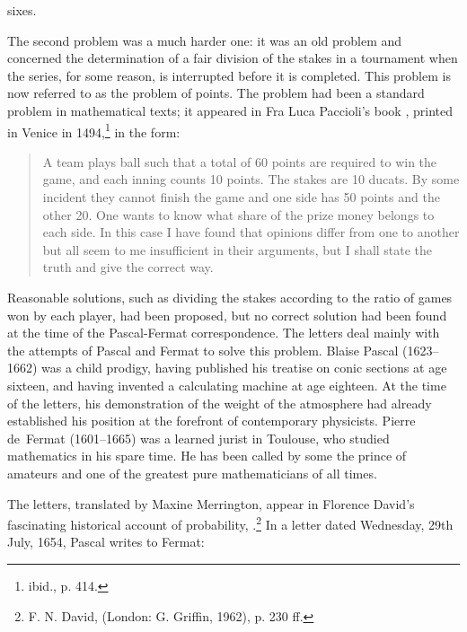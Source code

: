 sixes.
\par
The second problem was a much harder one: it was an old problem and concerned
the determination of a fair division of the stakes in a tournament when the
series, for some reason, is interrupted before it is completed.  This problem
is now referred to as the problem of points.  The problem
had been a standard problem in mathematical texts; it appeared in Fra Luca
Paccioli's book , printed in Venice in 1494,\footnote{ibid., p. 414.} in the
form:
\begin{quote}
A team plays ball such that a total of 60 points are required to win the
game, and each inning counts 10 points.  The stakes are 10 ducats.  By some
incident they cannot finish the game and one side has 50 points and the other
20.  One wants to know what share of the prize money belongs to each side.  In
this case I have found that opinions differ from one to another but all seem to
me insufficient in their arguments, but I shall state the truth and give the
correct way.
\end{quote}
\par
Reasonable solutions, such as dividing the stakes according to the ratio of
games won by each player, had been proposed, but no correct solution had been
found at the time of the Pascal-Fermat correspondence. 
The letters deal mainly with the attempts of Pascal and Fermat to solve this problem.  Blaise
Pascal (1623--1662) was a child prodigy, having published his
treatise on conic sections at age sixteen, and having invented a calculating
machine at age eighteen.  At the time of the letters, his demonstration of the weight of the
atmosphere had already established his position at the forefront of
contemporary physicists.  Pierre de~Fermat (1601--1665) was a learned jurist in
Toulouse, who studied mathematics in his spare time.  He has been called by some the prince of
amateurs and one of the greatest pure mathematicians of all times.
\par
The letters, translated by Maxine Merrington, appear in Florence David's
fascinating historical account of probability, .\footnote{F. N.
David,  (London: G. Griffin, 1962), p. 230
ff.}  In a letter dated Wednesday, 29th July, 1654, Pascal writes to
Fermat:
